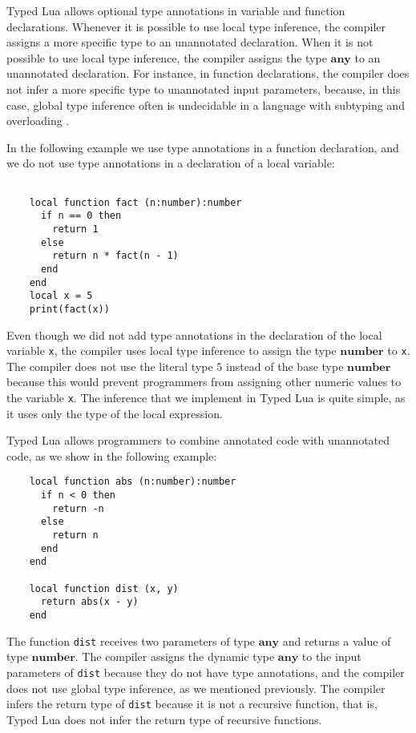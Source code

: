 \documentclass[preprint]{sig-alternate}
\newcommand{\Any}{\mathbf{any}}
\newcommand{\Number}{\mathbf{number}}
\begin{document}
Typed Lua allows optional type annotations in variable and function
declarations.
Whenever it is possible to use local type inference, the compiler
assigns a more specific type to an unannotated declaration.
When it is not possible to use local type inference, the compiler
assigns the type $\Any$ to an unannotated declaration.
For instance, in function declarations, the compiler does not infer
a more specific type to unannotated input parameters, because,
in this case, global type inference often is undecidable in a
language with subtyping and overloading \cite{wells1999typability}.

In the following example we use type annotations in a function
declaration, and we do not use type annotations in a declaration of a
local variable:
\begin{verbatim}

    local function fact (n:number):number
      if n == 0 then
        return 1
      else
        return n * fact(n - 1)
      end
    end
    local x = 5
    print(fact(x))
\end{verbatim}

Even though we did not add type annotations in the declaration of
the local variable \verb'x', the compiler uses local type inference to
assign the type $\Number$ to \verb'x'.
The compiler does not use the literal type $5$ instead of the base
type $\Number$ because this would prevent
programmers from assigning other numeric values to the variable
\verb'x'.
The inference that we implement in Typed Lua is quite simple, as it
uses only the type of the local expression.

Typed Lua allows programmers to combine annotated code with
unannotated code, as we show in the following example:
\begin{verbatim}
    local function abs (n:number):number
      if n < 0 then
        return -n
      else
        return n
      end
    end

    local function dist (x, y)
      return abs(x - y)
    end
\end{verbatim}

The function \verb'dist' receives two parameters of type $\Any$
and returns a value of type $\Number$.
The compiler assigns the dynamic type $\Any$ to the input
parameters of \verb'dist' because they do not have type annotations,
and the compiler does not use global type inference, as we mentioned
previously.
The compiler infers the return type of \verb'dist' because it is
not a recursive function, that is, Typed Lua does not infer the return
type of recursive functions.
\end{document}
